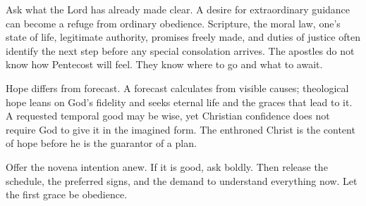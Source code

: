 Ask what the Lord has already made clear. A desire for extraordinary guidance can become a refuge from ordinary obedience. Scripture, the moral law, one's state of life, legitimate authority, promises freely made, and duties of justice often identify the next step before any special consolation arrives. The apostles do not know how Pentecost will feel. They know where to go and what to await.

Hope differs from forecast. A forecast calculates from visible causes; theological hope leans on God's fidelity and seeks eternal life and the graces that lead to it. A requested temporal good may be wise, yet Christian confidence does not require God to give it in the imagined form. The enthroned Christ is the content of hope before he is the guarantor of a plan.

Offer the novena intention anew. If it is good, ask boldly. Then release the schedule, the preferred signs, and the demand to understand everything now. Let the first grace be obedience.




